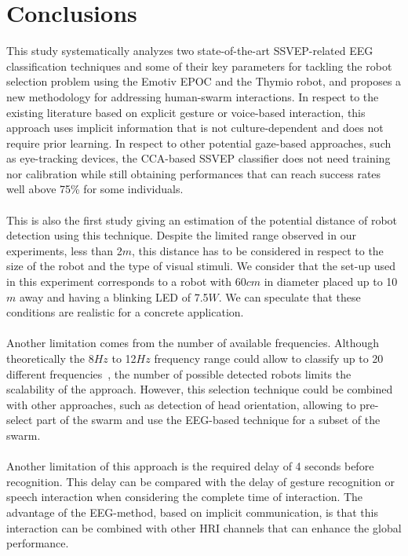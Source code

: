 \documentclass[smallextended]{svjour3}
\begin{document}
\section{Conclusions}
This study systematically analyzes two state-of-the-art SSVEP-related EEG classification techniques and some of their key parameters for tackling the robot selection problem using the Emotiv EPOC and the Thymio robot, and proposes a new methodology for addressing human-swarm interactions. 
In respect to the existing literature based on explicit gesture or voice-based interaction, this approach uses implicit information that is not culture-dependent and does not require prior learning. 
In respect to other potential gaze-based approaches, such as eye-tracking devices, the CCA-based SSVEP classifier does not need training nor calibration while still obtaining performances that can reach success rates well above 75\% for some individuals.\\
\\
This is also the first study giving an estimation of the potential distance of robot detection using this technique.
Despite the limited range observed in our experiments, less than 2$m$, this distance has to be considered in respect to the size of the robot and the type of visual stimuli. We consider that the set-up used in this experiment corresponds to a robot with 60$cm$ in diameter placed up to 10$m$ away and having a blinking LED of 7.5$W$. 
We can speculate that these conditions are realistic for a concrete application.\\
\\
Another limitation comes from the number of available frequencies.
Although theoretically the 8$Hz$ to 12$Hz$ frequency range could allow to classify up to 20 different frequencies~\cite{SSVEPfiability}, the number of possible detected robots limits the scalability of the approach. 
However, this selection technique could be combined with other approaches, such as detection of head orientation, allowing to pre-select part of the swarm and use the EEG-based technique for a subset of the swarm.\\
\\
Another limitation of this approach is the required delay of 4 seconds before recognition. This delay can be compared with the delay of gesture recognition or speech interaction when considering the complete time of interaction. The advantage of the EEG-method, based on implicit communication, is that this interaction can be combined with other HRI channels that can enhance the global performance.\\
\end{document}
